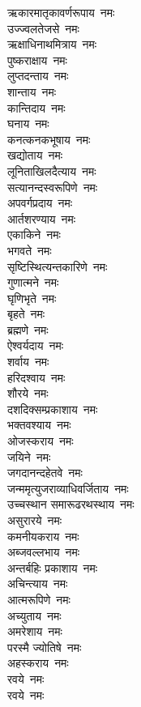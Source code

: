\begin{multicols}{2}
\begin{flushleft}
ऋकारमातृकावर्णरूपाय~नमः\\
उज्ज्वलतेजसे~नमः\\
ऋक्षाधिनाथमित्राय~नमः\\
पुष्कराक्षाय~नमः\\
लुप्तदन्ताय~नमः\\
शान्ताय~नमः\\
कान्तिदाय~नमः\\
घनाय~नमः\\
कनत्कनकभूषाय~नमः\hfill{}\\
खद्योताय~नमः\\
लूनिताखिलदैत्याय~नमः\\
सत्यानन्दस्वरूपिणे~नमः\\
अपवर्गप्रदाय~नमः\\
आर्तशरण्याय~नमः\\
एकाकिने~नमः\\
भगवते~नमः\\
सृष्टिस्थित्यन्तकारिणे~नमः\\
गुणात्मने~नमः\\
घृणिभृते~नमः\hfill{}\\
बृहते~नमः\\
ब्रह्मणे~नमः\\
ऐश्वर्यदाय~नमः\\
शर्वाय~नमः\\
हरिदश्वाय~नमः\\
शौरये~नमः\\
दशदिक्सम्प्रकाशाय~नमः\\
भक्तवश्याय~नमः\\
ओजस्कराय~नमः\\
जयिने~नमः\hfill{}\\
जगदानन्दहेतवे~नमः\\
जन्ममृत्युजराव्याधिवर्जिताय~नमः\\
उच्चस्थान समारूढरथस्थाय~नमः\\
असुरारये~नमः\\
कमनीयकराय~नमः\\
अब्जवल्लभाय~नमः\\
अन्तर्बहिः प्रकाशाय~नमः\\
अचिन्त्याय~नमः\\
आत्मरूपिणे~नमः\\
अच्युताय~नमः\hfill{}\\
अमरेशाय~नमः\\
परस्मै ज्योतिषे~नमः\\
अहस्कराय~नमः\\
रवये~नमः\\
रवये~नमः\\

\end{flushleft}
\end{multicols}
